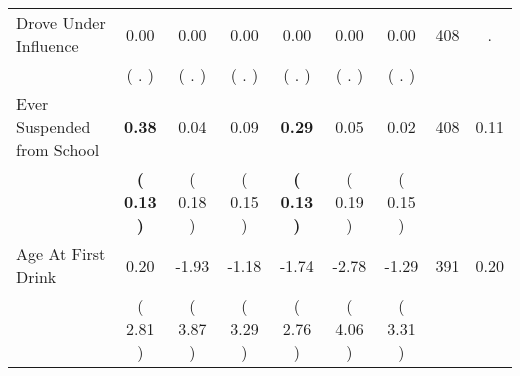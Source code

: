 \begin{tabular}{lcccccccc}
Drove Under Influence &      0.00 &      0.00 &      0.00 &      0.00 &      0.00 &      0.00 & 408 &          . \\ 
 & (        . ) & (        . ) & (        . ) & (        . ) & (        . ) & (        . ) & \\
Ever Suspended from School & \textbf{     0.38} &      0.04 &      0.09 & \textbf{     0.29} &      0.05 &      0.02 & 408 &       0.11 \\ 
 & \textbf{(     0.13 )} & (     0.18 ) & (     0.15 ) & \textbf{(     0.13 )} & (     0.19 ) & (     0.15 ) & \\
Age At First Drink &      0.20 &     -1.93 &     -1.18 &     -1.74 &     -2.78 &     -1.29 & 391 &       0.20 \\ 
 & (     2.81 ) & (     3.87 ) & (     3.29 ) & (     2.76 ) & (     4.06 ) & (     3.31 ) & \\
\bottomrule
\end{tabular}
